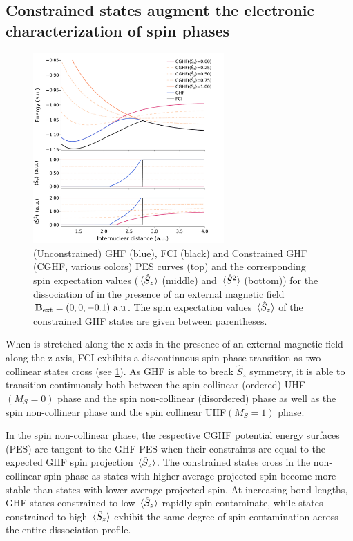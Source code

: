 \documentclass[journal=jctc,manuscript=article]{achemso}
\begin{document}
    \subsection{Constrained states augment the electronic characterization of spin phases} \label{sec:C-GHF-PES}

        \begin{figure}
            \centering
            \includegraphics[width=0.65\textwidth]{C-GHF-PES(H2)(med-B)}
            \caption{
                (Unconstrained) GHF (blue), FCI (black) and Constrained GHF (CGHF, various colors) PES curves (top) and the corresponding spin expectation values ($\ev*{\hat{S}_z}$ (middle) and $\ev*{\hat{S}^2}$ (bottom)) for the dissociation of  in the presence of an external magnetic field $\vb{B}_{\text{ext}} = (0,0,-0.1)\text{ a.u}$.
                The spin expectation values $\ev*{\hat{S}_z}$ of the constrained GHF states are given between parentheses.
            }
            \label{fig:C-GHF-PES(H2)(med-B)}
        \end{figure}

        When  is stretched along the x-axis in the presence of an external magnetic field along the z-axis, FCI exhibits a discontinuous spin phase transition as two collinear states cross (see \cref{fig:C-GHF-PES(H2)(med-B)}).
        As GHF is able to break $\hat{S}_z$ symmetry, it is able to transition continuously both between the spin collinear (ordered) UHF$(M_S=0)$ phase and the spin non-collinear (disordered) phase as well as the spin non-collinear phase and the spin collinear UHF$(M_S=1)$ phase. 

        In the spin non-collinear phase, the respective CGHF potential energy surfaces (PES) are tangent to the GHF PES when their constraints are equal to the expected GHF spin projection $\ev*{\hat{S}_z}$. 
        The constrained states cross in the non-collinear spin phase as states with higher average projected spin become more stable than states with lower average projected spin. 
        At increasing bond lengths, GHF states constrained to low $\ev*{\hat{S}_z}$ rapidly spin contaminate, while states constrained to high $\ev*{\hat{S}_z}$ exhibit the same degree of spin contamination across the entire dissociation profile.
\end{document}
